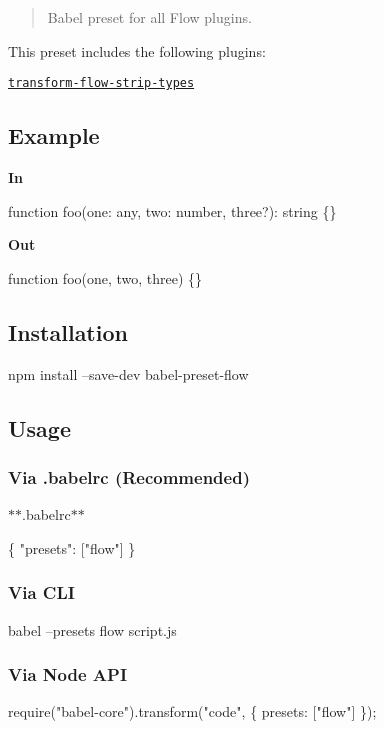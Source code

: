 \begin{quote}
Babel preset for all Flow plugins. \end{quote}


This preset includes the following plugins\+:


\begin{DoxyItemize}
\item \href{https://babeljs.io/docs/plugins/transform-flow-strip-types/}{\tt transform-\/flow-\/strip-\/types}
\end{DoxyItemize}

\subsection*{Example}

{\bfseries In}


\begin{DoxyCode}
function foo(one: any, two: number, three?): string \{\}
\end{DoxyCode}


{\bfseries Out}


\begin{DoxyCode}
function foo(one, two, three) \{\}
\end{DoxyCode}


\subsection*{Installation}


\begin{DoxyCode}
npm install --save-dev babel-preset-flow
\end{DoxyCode}


\subsection*{Usage}

\subsubsection*{Via {\ttfamily .babelrc} (Recommended)}

$\ast$$\ast$.babelrc$\ast$$\ast$


\begin{DoxyCode}
\{
  "presets": ["flow"]
\}
\end{DoxyCode}


\subsubsection*{Via C\+LI}


\begin{DoxyCode}
babel --presets flow script.js
\end{DoxyCode}


\subsubsection*{Via Node A\+PI}


\begin{DoxyCode}
require("babel-core").transform("code", \{
  presets: ["flow"]
\});
\end{DoxyCode}
 